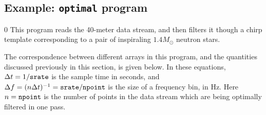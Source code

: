 \subsection{Example: {\tt optimal} program}
\setcounter{equation}0
This program reads the 40-meter data stream, and then filters it though
a chirp template corresponding to a pair of inspiraling $1.4 M_\odot$
neutron stars.

The correspondence between different arrays in this program, and the
quantities discussed previously in this section, is given below.  In these
equations, $\Delta t = 1/{\tt srate}$ is the sample time in seconds, and
$\Delta f = (n \Delta t)^{-1} = {\tt srate/npoint}$ is the size of a
frequency bin, in Hz.  Here $n={\tt npoint}$ is the number of points in
the data stream which are being optimally filtered in one pass.

